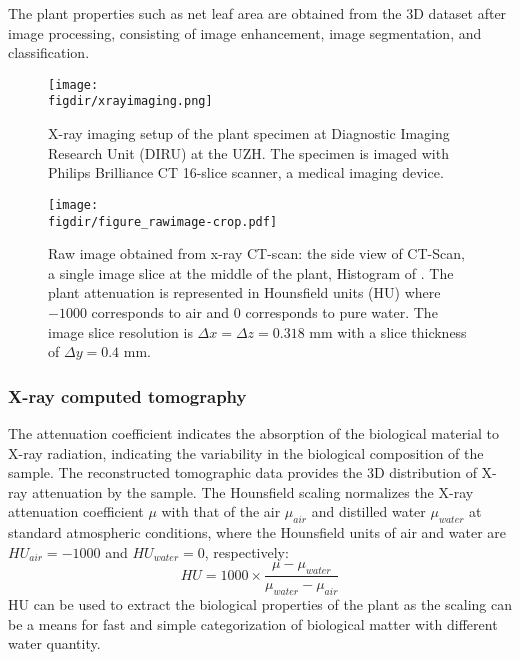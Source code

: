 The plant properties such as net leaf area are obtained from the 3D dataset after image processing, consisting of image enhancement, image segmentation, and classification.

\begin{figure}[t]
	\centering
	\texttt{[image: \\figdir/xrayimaging.png]}
	\caption{X-ray imaging setup of the plant specimen at Diagnostic Imaging Research Unit (DIRU) at the UZH. The specimen is imaged with Philips Brilliance CT 16-slice scanner, a medical imaging device.}
	\label{fig:xrayimaging}
\end{figure}

\begin{figure}[t]
	\centering
	\texttt{[image: \\figdir/figure\_rawimage-crop.pdf]}
	\caption{Raw image obtained from x-ray CT-scan:  the side view of CT-Scan,  a single image slice at the middle of the plant,  Histogram of . The plant attenuation is represented in Hounsfield units (HU) where $-1000$ corresponds to air and $0$ corresponds to pure water. The image slice resolution is $\Delta x = \Delta z=0.318$ mm with a slice thickness of $\Delta y=0.4$ mm.}
	\label{fig:figure_rawimage}
\end{figure}


\subsubsection*{X-ray computed tomography}

The attenuation coefficient indicates the absorption of the biological material to X-ray radiation, indicating the variability in the biological composition of the sample. The reconstructed tomographic data provides the 3D distribution of X-ray attenuation by the sample. The Hounsfield scaling normalizes the X-ray attenuation coefficient $\mu$ with that of the air $\mu_{\textit{air}}$ and distilled water $\mu_{\textit{water}}$ at standard atmospheric conditions, where the Hounsfield units of air and water are $HU_{\textit{air}}=-1000$ and $HU_{\textit{water}}=0$, respectively:
\begin{equation}
HU = 1000 \times \frac{{\mu  - {\mu _{\textit{water}}}}}{{{\mu _{\textit{water}}} - {\mu _{\textit{air}}}}}
\end{equation}
HU can be used to extract the biological properties of the plant as the scaling can be a means for fast and simple categorization of biological matter with different water quantity. 

